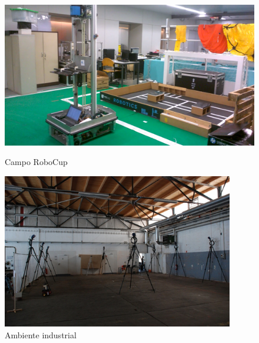\documentclass[9pt,a4paper]{extarticle}
\begin{document}
\begin{multicols}{2}
\vspace{-7pt}
\begin{figure}[H]
	\centering
	\begin{minipage}[t]{0.23\textwidth}
		\centering
		\includegraphics[width=\textwidth]{jarvis-environment-front-right}
		\caption{\small Campo RoboCup}
		\label{fig:jarvis-environment}
	\end{minipage}\hfill
	\begin{minipage}[t]{0.217\textwidth}
		\centering
		\includegraphics[width=0.9\textwidth]{industrial-hall}
		\caption{\small Ambiente industrial \cite{Sturm2012}}
		\label{fig:pioneer-environment}
	\end{minipage}
\end{figure}



\end{multicols}
\end{document}
